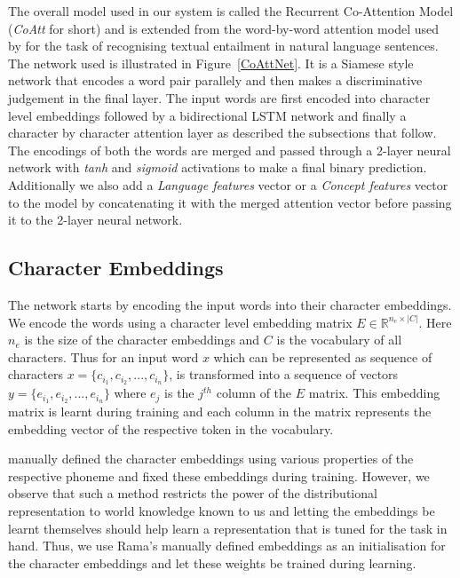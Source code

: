 \documentclass[11pt,letterpaper]{article}
\begin{document}
The overall model used in our system is called the Recurrent Co-Attention Model (\textit{CoAtt} for short) and is extended from the word-by-word attention model used by \cite{rocktaschel2016reasoning} for the task of recognising textual entailment in natural language sentences. The network used is illustrated in Figure~\ref{CoAttNet}. It is a Siamese style network that encodes a word pair parallely and then makes a discriminative judgement in the final layer. The input words are first encoded into character level embeddings followed by a bidirectional LSTM network and finally a character by character attention layer as described the subsections that follow. The encodings of both the words are merged and passed through a 2-layer neural network with \textit{tanh} and \textit{sigmoid} activations to make a final binary prediction. Additionally we also add a \textit{Language features} vector or a \textit{Concept features} vector to the model by concatenating it with the merged attention vector before passing it to the 2-layer neural network.

\subsection{Character Embeddings}

The network starts by encoding the input words into their character embeddings. We encode the words using a character level embedding matrix $E \in \mathbb{R}^{n_e \times |C|}$. Here $n_e$ is the size of the character embeddings and $C$ is the vocabulary of all characters. Thus for an input word $x$ which can be represented as sequence of characters $x = \{c_{i_1}, c_{i_2}, ..., c_{i_n}\}$, is transformed into a sequence of vectors $y = \{e_{i_1}, e_{i_2}, ..., e_{i_n}\}$ where $e_j$ is the $j^{th}$ column of the $E$ matrix. This embedding matrix is learnt during training and each column in the matrix represents the embedding vector of the respective token in the vocabulary. 

\cite{rama2016siamese} manually defined the character embeddings using various properties of the respective phoneme and fixed these embeddings during training. However, we observe that such a method restricts the power of the distributional representation to world knowledge known to us and letting the embeddings be learnt themselves should help learn a representation that is tuned for the task in hand. Thus, we use Rama's manually defined embeddings as an initialisation for the character embeddings and let these weights be trained during learning. 
\end{document}
